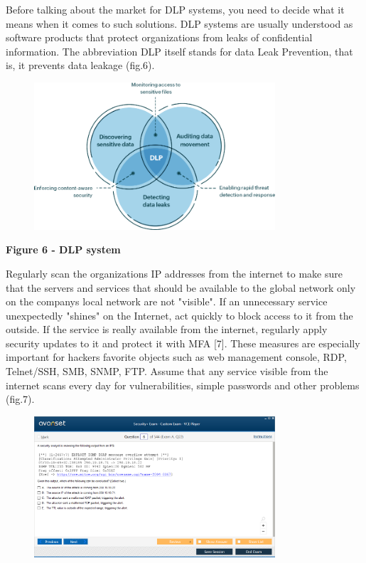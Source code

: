Before talking about the market for DLP systems, you need to decide what
it means when it comes to such solutions. DLP systems are usually
understood as software products that protect organizations from leaks of
confidential information. The abbreviation DLP itself stands for data
Leak Prevention, that is, it prevents data leakage (fig.6).

\begin{figure}[H]
	\centering
	\includegraphics[width=0.8\textwidth]{assets/68}
	\caption*{}
\end{figure}

\textbf{Figure 6 - DLP system}

Regularly scan the organization\textquotesingle s IP addresses from the
internet to make sure that the servers and services that should be
available to the global network only on the company\textquotesingle s
local network are not "visible". If an unnecessary service unexpectedly
"shines" on the Internet, act quickly to block access to it from the
outside. If the service is really available from the internet, regularly
apply security updates to it and protect it with MFA {[}7{]}. These
measures are especially important for hackers \textquotesingle{}
favorite objects such as web management console, RDP, Telnet/SSH, SMB,
SNMP, FTP. Assume that any service visible from the internet scans every
day for vulnerabilities, simple passwords and other problems (fig.7).

\begin{figure}[H]
	\centering
	\includegraphics[width=0.8\textwidth]{assets/69}
	\caption*{}
\end{figure}

